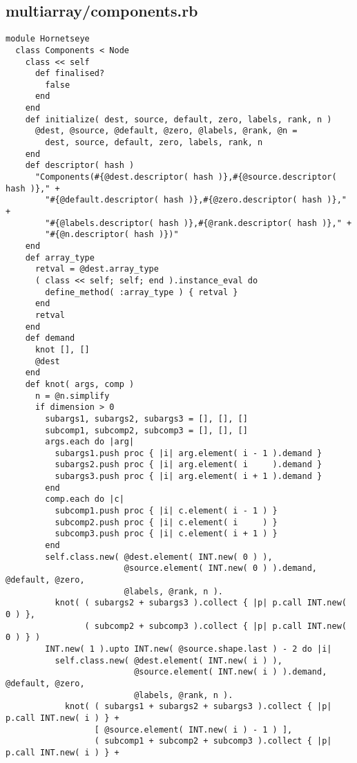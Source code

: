 \subsection{multiarray/components.rb}\label{cha:multiarray-components-rb}
\begin{lstlisting}
module Hornetseye
  class Components < Node
    class << self
      def finalised?
        false
      end
    end
    def initialize( dest, source, default, zero, labels, rank, n )
      @dest, @source, @default, @zero, @labels, @rank, @n =
        dest, source, default, zero, labels, rank, n
    end
    def descriptor( hash )
      "Components(#{@dest.descriptor( hash )},#{@source.descriptor( hash )}," +
        "#{@default.descriptor( hash )},#{@zero.descriptor( hash )}," +
        "#{@labels.descriptor( hash )},#{@rank.descriptor( hash )}," +
        "#{@n.descriptor( hash )})"
    end
    def array_type
      retval = @dest.array_type
      ( class << self; self; end ).instance_eval do
        define_method( :array_type ) { retval }
      end
      retval
    end
    def demand
      knot [], []
      @dest
    end
    def knot( args, comp )
      n = @n.simplify
      if dimension > 0
        subargs1, subargs2, subargs3 = [], [], []
        subcomp1, subcomp2, subcomp3 = [], [], []
        args.each do |arg|
          subargs1.push proc { |i| arg.element( i - 1 ).demand }
          subargs2.push proc { |i| arg.element( i     ).demand }
          subargs3.push proc { |i| arg.element( i + 1 ).demand }
        end
        comp.each do |c|
          subcomp1.push proc { |i| c.element( i - 1 ) }
          subcomp2.push proc { |i| c.element( i     ) }
          subcomp3.push proc { |i| c.element( i + 1 ) }
        end
        self.class.new( @dest.element( INT.new( 0 ) ),
                        @source.element( INT.new( 0 ) ).demand, @default, @zero,
                        @labels, @rank, n ).
          knot( ( subargs2 + subargs3 ).collect { |p| p.call INT.new( 0 ) },
                ( subcomp2 + subcomp3 ).collect { |p| p.call INT.new( 0 ) } )
        INT.new( 1 ).upto INT.new( @source.shape.last ) - 2 do |i|
          self.class.new( @dest.element( INT.new( i ) ),
                          @source.element( INT.new( i ) ).demand, @default, @zero,
                          @labels, @rank, n ).
            knot( ( subargs1 + subargs2 + subargs3 ).collect { |p| p.call INT.new( i ) } +
                  [ @source.element( INT.new( i ) - 1 ) ],
                  ( subcomp1 + subcomp2 + subcomp3 ).collect { |p| p.call INT.new( i ) } +

\end{lstlisting}
